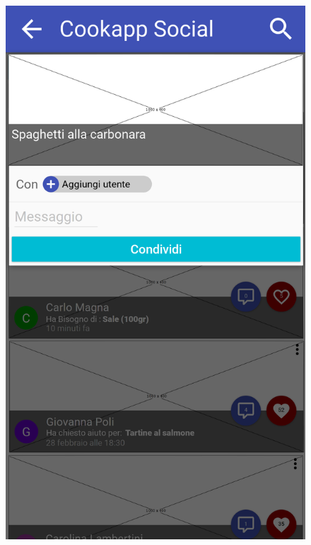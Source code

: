 \begin{figure}[H]
	\begin{minipage}{.49\textwidth}
		\includegraphics[width=\textwidth]{img/wireframe/condividi_ricetta_selezionata.png}
	\end{minipage}
	\begin{minipage}{.49\textwidth}

\end{minipage}
\end{figure}
